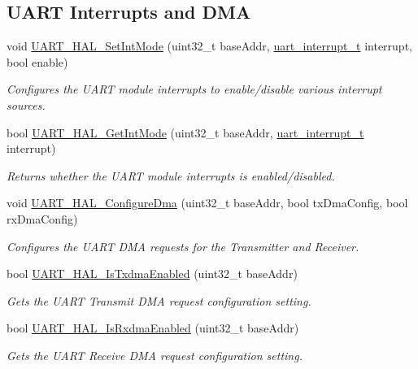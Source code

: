 \subsection*{U\+A\+RT Interrupts and D\+MA}
\begin{DoxyCompactItemize}
\item 
void \hyperlink{group__uart__hal_ga9aa343e46359a2025e402de937e0efdd}{U\+A\+R\+T\+\_\+\+H\+A\+L\+\_\+\+Set\+Int\+Mode} (uint32\+\_\+t base\+Addr, \hyperlink{group__uart__hal_ga8e2791d1785e2c0036663b1e1be51a14}{uart\+\_\+interrupt\+\_\+t} interrupt, bool enable)
\begin{DoxyCompactList}\small\item\em Configures the U\+A\+RT module interrupts to enable/disable various interrupt sources. \end{DoxyCompactList}\item 
bool \hyperlink{group__uart__hal_ga993b9ff384266914cf928b985b188ee9}{U\+A\+R\+T\+\_\+\+H\+A\+L\+\_\+\+Get\+Int\+Mode} (uint32\+\_\+t base\+Addr, \hyperlink{group__uart__hal_ga8e2791d1785e2c0036663b1e1be51a14}{uart\+\_\+interrupt\+\_\+t} interrupt)
\begin{DoxyCompactList}\small\item\em Returns whether the U\+A\+RT module interrupts is enabled/disabled. \end{DoxyCompactList}\item 
void \hyperlink{group__uart__hal_ga4cc50e15355a7675b47a5fc0eaa6d0dd}{U\+A\+R\+T\+\_\+\+H\+A\+L\+\_\+\+Configure\+Dma} (uint32\+\_\+t base\+Addr, bool tx\+Dma\+Config, bool rx\+Dma\+Config)
\begin{DoxyCompactList}\small\item\em Configures the U\+A\+RT D\+MA requests for the Transmitter and Receiver. \end{DoxyCompactList}\item 
bool \hyperlink{group__uart__hal_gab6bb5255cad2ddfe48c9f184a73cfd8e}{U\+A\+R\+T\+\_\+\+H\+A\+L\+\_\+\+Is\+Txdma\+Enabled} (uint32\+\_\+t base\+Addr)
\begin{DoxyCompactList}\small\item\em Gets the U\+A\+RT Transmit D\+MA request configuration setting. \end{DoxyCompactList}\item 
bool \hyperlink{group__uart__hal_gaf344d7aae4af26626211e1cae9e27498}{U\+A\+R\+T\+\_\+\+H\+A\+L\+\_\+\+Is\+Rxdma\+Enabled} (uint32\+\_\+t base\+Addr)
\begin{DoxyCompactList}\small\item\em Gets the U\+A\+RT Receive D\+MA request configuration setting. \end{DoxyCompactList}\end{DoxyCompactItemize}
